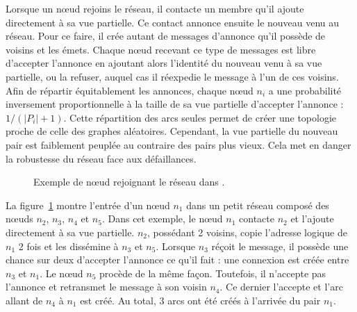 \noindent Lorsque un nœud rejoins le réseau, il contacte un membre qu'il ajoute
directement à sa vue partielle. Ce contact annonce ensuite le nouveau venu au
réseau. Pour ce faire, il crée autant de messages d'annonce qu'il possède de
voisins et les émets. Chaque nœud recevant ce type de messages est libre
d'accepter l'annonce en ajoutant alors l'identité du nouveau venu à sa vue
partielle, ou la refuser, auquel cas il réexpedie le message à l'un de ces
voisins. Afin de répartir équitablement les annonces, chaque nœud $n_i$ a une
probabilité inversement proportionnelle à la taille de sa vue partielle
d'accepter l'annonce : $1/(|P_i|+1)$. Cette répartition des arcs seules permet
de créer une topologie proche de celle des graphes aléatoires. Cependant, la vue
partielle du nouveau pair est faiblement peuplée au contraire des pairs plus
vieux. Cela met en danger la robustesse du réseau face aux défaillances.

\begin{figure}
  \centering
  
  \caption[Entrée dans un réseau par \SCAMP]
  {\label{net:fig:scampexample} Exemple de nœud rejoignant le réseau dans
    \SCAMP.}
\end{figure}

\noindent La figure~\ref{net:fig:scampexample} montre l'entrée d'un nœud $n_1$
dans un petit réseau \SCAMP composé des nœuds $n_2$, $n_3$, $n_4$ et $n_5$. Dans
cet exemple, le nœud $n_1$ contacte $n_2$ et l'ajoute directement à sa vue
partielle. $n_2$, possédant 2 voisins, copie l'adresse logique de $n_1$ 2 fois
et les dissémine à $n_3$ et $n_5$. Lorsque $n_3$ réçoit le message, il possède
une chance sur deux d'accepter l'annonce ce qu'il fait : une connexion est créée
entre $n_3$ et $n_1$. Le nœud $n_5$ procède de la même façon. Toutefois, il
n'accepte pas l'annonce et retransmet le message à son voisin $n_4$. Ce dernier
l'accepte et l'arc allant de $n_4$ à $n_1$ est créé. Au total, 3 arcs ont été
créés à l'arrivée du pair $n_1$.


